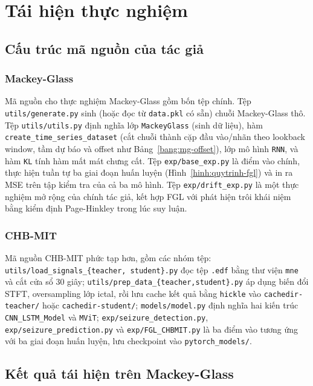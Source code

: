\chapter{Tái hiện thực nghiệm}
\label{chuong:taihien}

\section{Cấu trúc mã nguồn của tác giả}

\subsection{Mackey-Glass}

Mã nguồn cho thực nghiệm Mackey-Glass gồm bốn tệp chính. Tệp \texttt{utils/generate.py} sinh
(hoặc đọc từ \texttt{data.pkl} có sẵn) chuỗi Mackey-Glass thô. Tệp \texttt{utils/utils.py}
định nghĩa lớp \texttt{MackeyGlass} (sinh dữ liệu), hàm \texttt{create\_time\_series\_dataset}
(cắt chuỗi thành cặp đầu vào/nhãn theo lookback window, tầm dự báo và offset như
Bảng~\ref{bang:mg-offset}), lớp mô hình \texttt{RNN}, và hàm \texttt{KL} tính hàm mất mát chưng
cất. Tệp \texttt{exp/base\_exp.py} là điểm vào chính, thực hiện tuần tự ba giai đoạn huấn
luyện (Hình~\ref{hinh:quytrinh-fgl}) và in ra MSE trên tập kiểm tra của cả ba mô hình. Tệp
\texttt{exp/drift\_exp.py} là một thực nghiệm mở rộng của chính tác giả, kết hợp FGL với phát
hiện trôi khái niệm bằng kiểm định Page-Hinkley trong lúc suy luận.

\subsection{CHB-MIT}

Mã nguồn CHB-MIT phức tạp hơn, gồm các nhóm tệp: \texttt{utils/load\_signals\_\{teacher,
student\}.py} đọc tệp \texttt{.edf} bằng thư viện \texttt{mne} và cắt cửa sổ 30 giây;
\texttt{utils/prep\_data\_\{teacher,student\}.py} áp dụng biến đổi STFT, oversampling lớp
ictal, rồi lưu cache kết quả bằng \texttt{hickle} vào \texttt{cachedir-teacher/} hoặc
\texttt{cachedir-student/}; \texttt{models/model.py} định nghĩa hai kiến trúc
\texttt{CNN\_LSTM\_Model} và \texttt{MViT}; \texttt{exp/seizure\_detection.py},
\texttt{exp/seizure\_prediction.py} và \texttt{exp/FGL\_CHBMIT.py} là ba điểm vào tương ứng
với ba giai đoạn huấn luyện, lưu checkpoint vào \texttt{pytorch\_models/}.

\section{Kết quả tái hiện trên Mackey-Glass}

